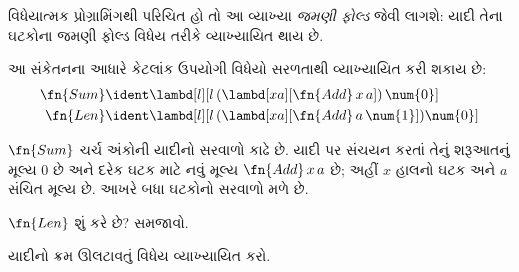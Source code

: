 \begin{digress}
  વિધેયાત્મક પ્રોગ્રામિંગથી પરિચિત હો
  તો આ વ્યાખ્યા \emph{જમણી ફોલ્ડ} જેવી
  લાગશે: યાદી તેના ઘટકોના જમણી ફોલ્ડ
  વિધેય તરીકે વ્યાખ્યાયિત થાય છે.
\end{digress}

આ સંકેતનના આધારે કેટલાંક ઉપયોગી વિધેયો
સરળતાથી વ્યાખ્યાયિત કરી શકાય છે:
\begin{align*}
  \fn{Sum} & \ident
  \lambd[l][l \, (\lambd[xa][\fn{Add} \, x \, a])\,  \num{0}]\\
  \fn{Len} & \ident
  \lambd[l][l \, (\lambd[xa][\fn{Add} \, a \, \num{1}]) \num{0}]
\end{align*}

$\fn{Sum}$ ચર્ચ અંકોની યાદીનો સરવાળો
કાઢે છે. યાદી પર સંચયન કરતાં તેનું
શરૂઆતનું મૂલ્ય $\num{0}$ છે અને દરેક
ઘટક માટે નવું મૂલ્ય $\fn{Add} \, x\, a$
છે; અહીં $x$ હાલનો ઘટક અને $a$ સંચિત
મૂલ્ય છે. આખરે બધા ઘટકોનો સરવાળો મળે છે.

\begin{prob}
  $\fn{Len}$ શું કરે છે? સમજાવો.
\end{prob}

\begin{prob}
  યાદીનો ક્રમ ઊલટાવતું વિધેય વ્યાખ્યાયિત કરો.
\end{prob}
\endgroup
\endgroup


\OLEndPartHook
